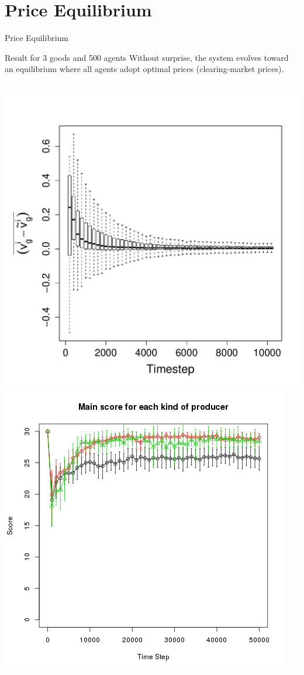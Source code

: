 \documentclass[8pt, handout=show,notes=show]{beamer}
\begin{document}
\section{Price Equilibrium}
\begin{frame}{Price Equilibrium}

	\begin{block}{Result for 3 goods and 500 agents}
		Without surprise, the system evolves toward an equilibrium where all agents adopt optimal prices (clearing-market prices). 
	\end{block}
	\begin{columns}
		\includegraphics[height=\textwidth]{./ClearingPriceDistanceEvolutionForTrade-G3N500.pdf}
		\includegraphics[width=\textwidth]{./scoreEx1.png}\\

\end{columns}
\end{frame}
\end{document}
